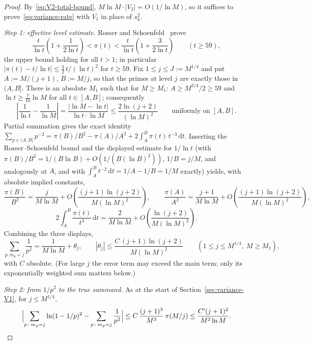 \documentclass[11pt]{article}
\theoremstyle{remark}
\begin{document}
\begin{proof}
By~\eqref{eq:V2-total-bound}, $M \ln M \cdot |V_2| = O(1/\ln M)$, so it suffices to prove~\eqref{eq:variance-rate} with $V_1$ in place of $s_k^2$.

\emph{Step 1: effective level estimate.} Rosser and Schoenfeld~\cite[Thm.~1]{RosserSchoenfeld1962} prove
\[
\frac{t}{\ln t}\left(1 + \frac{1}{2 \ln t}\right) < \pi(t) < \frac{t}{\ln t}\left(1 + \frac{3}{2 \ln t}\right)
\qquad (t \geq 59),
\]
the upper bound holding for all $t > 1$; in particular $|\pi(t) - t/\ln t| \leq \tfrac{3}{2}\, t/(\ln t)^2$ for $t \geq 59$. Fix $1 \leq j \leq J := M^{1/4}$ and put $A := M/(j+1)$, $B := M/j$, so that the primes at level $j$ are exactly those in $(A, B]$. There is an absolute $M_1$ such that for $M \geq M_1$: $A \geq M^{3/4}/2 \geq 59$ and $\ln t \geq \tfrac{7}{10} \ln M$ for all $t \in [A, B]$; consequently
\[
\left| \frac{1}{\ln t} - \frac{1}{\ln M} \right| = \frac{|\ln M - \ln t|}{\ln t \cdot \ln M} \leq \frac{2 \ln(j+2)}{(\ln M)^2}
\qquad \text{uniformly on } [A, B].
\]
Partial summation gives the exact identity $\sum_{p \in (A, B]} p^{-2} = \pi(B)/B^2 - \pi(A)/A^2 + 2 \int_A^B \pi(t)\, t^{-3}\, \mathrm{d}t$. Inserting the Rosser--Schoenfeld bound and the displayed estimate for $1/\ln t$ (with $\pi(B)/B^2 = 1/(B \ln B) + O(1/(B (\ln B)^2))$, $1/B = j/M$, and analogously at $A$, and with $\int_A^B t^{-2}\, \mathrm{d}t = 1/A - 1/B = 1/M$ exactly) yields, with absolute implied constants,
\[
\frac{\pi(B)}{B^2} = \frac{j}{M \ln M} + O\!\left(\frac{(j+1) \ln(j+2)}{M (\ln M)^2}\right),
\qquad
\frac{\pi(A)}{A^2} = \frac{j+1}{M \ln M} + O\!\left(\frac{(j+1) \ln(j+2)}{M (\ln M)^2}\right),
\]
\[
2 \int_A^B \frac{\pi(t)}{t^3}\, \mathrm{d}t = \frac{2}{M \ln M} + O\!\left(\frac{\ln(j+2)}{M (\ln M)^2}\right).
\]
Combining the three displays,
\begin{equation}\label{eq:level-quant}
\sum_{p \colon m_p = j} \frac{1}{p^2} = \frac{1}{M \ln M} + \theta_j,
\qquad
|\theta_j| \leq \frac{C\, (j+1) \ln(j+2)}{M (\ln M)^2}
\qquad (1 \leq j \leq M^{1/4},\ M \geq M_1),
\end{equation}
with $C$ absolute. (For large $j$ the error term may exceed the main term; only its exponentially weighted sum matters below.)

\emph{Step 2: from $1/p^2$ to the true summand.} As at the start of Section~\ref{sec:variance-V1}, for $j \leq M^{1/4}$,
\[
\Bigl| \sum_{p \colon m_p = j} \ln(1 - 1/p)^2 - \sum_{p \colon m_p = j} \frac{1}{p^2} \Bigr|
\leq C\, \frac{(j+1)^3}{M^3}\, \pi(M/j)
\leq \frac{C' (j+1)^2}{M^2 \ln M}.
\]


\end{proof}
\end{document}
